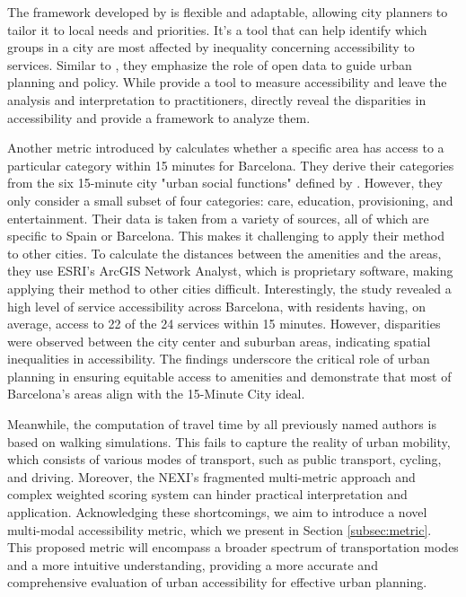 The framework developed by  is flexible and adaptable, allowing city planners to tailor it to local needs and priorities. 
It's a tool that can help identify which groups in a city are most affected by inequality concerning accessibility to services. 
Similar to , they emphasize the role of open data to guide urban planning and policy.
While  provide a tool to measure accessibility and leave the analysis and interpretation to practitioners,  directly reveal the disparities in accessibility and provide a framework to analyze them.

Another metric introduced by  calculates whether a specific area has access to a particular category within 15 minutes for Barcelona.
They derive their categories from the six 15-minute city "urban social functions" defined by .
However, they only consider a small subset of four categories: care, education, provisioning, and entertainment.
Their data is taken from a variety of sources, all of which are specific to Spain or Barcelona.
This makes it challenging to apply their method to other cities.
To calculate the distances between the amenities and the areas, they use ESRI's ArcGIS Network Analyst, which is proprietary software, making applying their method to other cities difficult.
Interestingly, the study revealed a high level of service accessibility across Barcelona, with residents having, on average, access to 22 of the 24 services within 15 minutes. 
However, disparities were observed between the city center and suburban areas, indicating spatial inequalities in accessibility.
The findings underscore the critical role of urban planning in ensuring equitable access to amenities and demonstrate that most of Barcelona's areas align with the 15-Minute City ideal. 

Meanwhile, the computation of travel time by all previously named authors is based on walking simulations. 
This fails to capture the reality of urban mobility, which consists of various modes of transport, such as public transport, cycling, and driving.
Moreover, the NEXI's fragmented multi-metric approach and complex weighted scoring system can hinder practical interpretation and application.
Acknowledging these shortcomings, we aim to introduce a novel multi-modal accessibility metric, which we present in Section \ref{subsec:metric}.
This proposed metric will encompass a broader spectrum of transportation modes and a more intuitive understanding, providing a more accurate and comprehensive evaluation of urban accessibility for effective urban planning.

